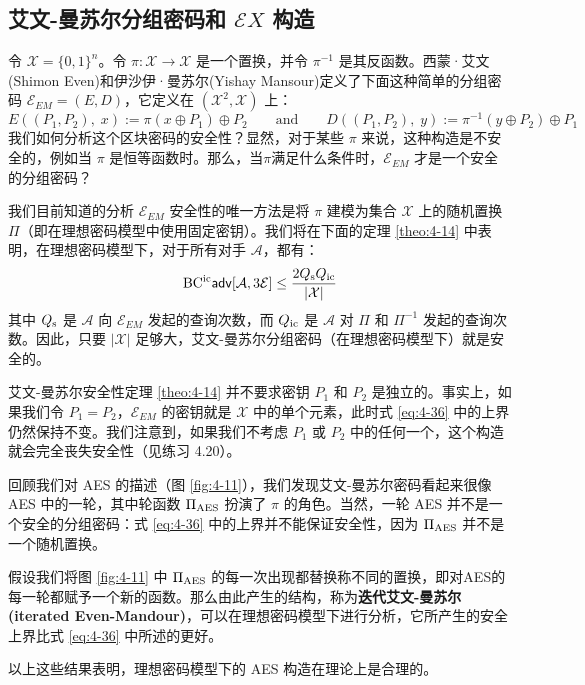 \subsection{艾文-曼苏尔分组密码和 $\mathcal{E}X$ 构造}

令 $\mathcal{X}=\{0,1\}^n$。令 $\pi:\mathcal{X}\to\mathcal{X}$ 是一个置换，并令 $\pi^{-1}$ 是其反函数。西蒙·艾文(Shimon Even)和伊沙伊·曼苏尔(Yishay Mansour)定义了下面这种简单的分组密码 $\mathcal{E}_{EM}=(E,D)$，它定义在 $(\mathcal{X}^2,\mathcal{X})$ 上：
\begin{equation}\label{eq:4-35}
E((P_1,P_2),\;x):=\pi(x\oplus P_1)\oplus P_2
\quad\quad\text{and}\quad\quad
D((P_1,P_2),\;y):=\pi^{-1}(y\oplus P_2)\oplus P_1
\end{equation}
我们如何分析这个区块密码的安全性？显然，对于某些 $\pi$ 来说，这种构造是不安全的，例如当 $\pi$ 是恒等函数时。那么，当$\pi$满足什么条件时，$\mathcal{E}_{EM}$ 才是一个安全的分组密码？

我们目前知道的分析 $\mathcal{E}_{EM}$ 安全性的唯一方法是将 $\pi$ 建模为集合 $\mathcal{X}$ 上的随机置换 $\Pi$（即在理想密码模型中使用固定密钥）。我们将在下面的定理 \ref{theo:4-14} 中表明，在理想密码模型下，对于所有对手 $\mathcal{A}$，都有：
\begin{equation}\label{eq:4-36}
{\rm BC^{ic}\mathsf{adv}}[\mathcal{A},3\mathcal{E}]\leq\frac{2Q_{\rm s}Q_{\rm ic}}{|\mathcal{X}|}
\end{equation}
其中 $Q_{\rm s}$ 是 $\mathcal{A}$ 向 $\mathcal{E}_{EM}$ 发起的查询次数，而 $Q_{\rm ic}$ 是 $\mathcal{A}$ 对 $\Pi$ 和 $\Pi^{-1}$ 发起的查询次数。因此，只要 $|\mathcal{X}|$ 足够大，艾文-曼苏尔分组密码（在理想密码模型下）就是安全的。

艾文-曼苏尔安全性定理 \ref{theo:4-14} 并不要求密钥 $P_1$ 和 $P_2$ 是独立的。事实上，如果我们令 $P_1=P_2$，$\mathcal{E}_{EM}$ 的密钥就是 $\mathcal{X}$ 中的单个元素，此时式 \ref{eq:4-36} 中的上界仍然保持不变。我们注意到，如果我们不考虑 $P_1$ 或 $P_2$ 中的任何一个，这个构造就会完全丧失安全性（见练习 4.20）。

\begin{snote}
回顾我们对 AES 的描述（图 \ref{fig:4-11}），我们发现艾文-曼苏尔密码看起来很像 AES 中的一轮，其中轮函数 $\Pi_{\rm AES}$ 扮演了 $\pi$ 的角色。当然，一轮 AES 并不是一个安全的分组密码：式 \ref{eq:4-36} 中的上界并不能保证安全性，因为 $\Pi_{\rm AES}$ 并不是一个随机置换。

假设我们将图 \ref{fig:4-11} 中 $\Pi_{\rm AES}$ 的每一次出现都替换称不同的置换，即对AES的每一轮都赋予一个新的函数。那么由此产生的结构，称为\textbf{迭代艾文-曼苏尔 (iterated Even-Mandour)}，可以在理想密码模型下进行分析，它所产生的安全上界比式 \ref{eq:4-36} 中所述的更好。

以上这些结果表明，理想密码模型下的 AES 构造在理论上是合理的。
\end{snote}

